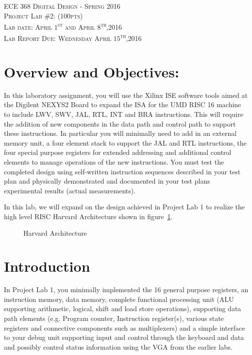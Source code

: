 \documentclass{article}
\begin{document}
\begin{center}
\textsc{\huge ECE 368 Digital Design - Spring 2016}\\[1cm]
\textsc{{\LARGE Project Lab \#2: (100pts)}}\\[0.5cm]
\textsc{\Large Lab date: April $1$\textsuperscript{st} and April $8$\textsuperscript{th},2016}\\[0.5cm]
\textsc{\Large Lab Report Due: Wednesday April $15$\textsuperscript{th},2016}\\[1cm]
\end{center}

\section{Overview and Objectives:}
In this laboratory assignment, you will use the Xilinx ISE software tools aimed at the Digilent NEXYS2 Board to expand the ISA for the UMD RISC 16 machine to include LWV, SWV, JAL, RTL, INT and BRA instructions. This will require the addition of new components in the data path and control path to support these instructions. In particular you will minimally need to add in an external memory unit, a four element stack to support the JAL and RTL instructions, the four special purpose registers for extended addressing and additional control elements to manage operations of the new instructions. You must test the completed design using self-written instruction sequences described in your test plan and physically demonstrated and documented in your test plans experimental results (actual measurements).

In this lab, we will expand on the design achieved in Project Lab 1 to realize the high level RISC Harvard Architecture shown in figure~\ref{fig:harvardarc}.

\begin{figure}[!htbp]
  \centering
  \caption{Harvard Architecture}
  \label{fig:harvardarc}
\end{figure}
\FloatBarrier

\section{Introduction}

In Project Lab 1, you minimally implemented the 16 general purpose registers, an instruction memory, data memory, complete functional processing unit (ALU supporting arithmetic, logical, shift and load store operations), supporting data path elements (e.g. Program counter, Instruction  register(s), various state registers and connective components such as multiplexers) and a simple interface to your debug unit supporting input and control through the keyboard and data and possibly control status information using the VGA from the earlier labs. 
\end{document}
